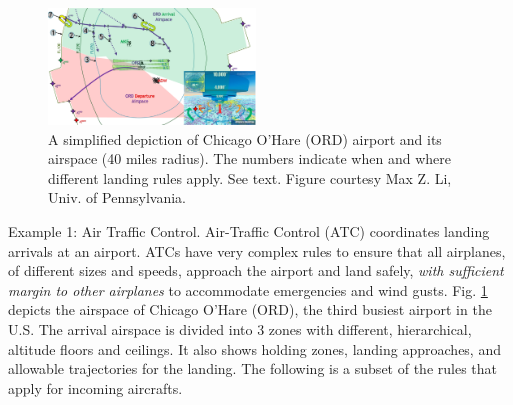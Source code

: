 \begin{figure}[t]
\centering
\includegraphics[width=0.49\textwidth]{figures/ATC_Example}
\caption{{\small A simplified depiction of Chicago O'Hare (ORD) airport and its airspace (40 miles radius). 
		The numbers indicate when and where different landing rules apply. See text. Figure courtesy Max Z. Li, Univ. of Pennsylvania.} }
\label{fig:atc_example}
\end{figure}

{\sf Example 1: Air Traffic Control}.
Air-Traffic Control (ATC) coordinates landing arrivals at an airport. 
ATCs have very complex rules to ensure that all airplanes, of different sizes and speeds, approach the airport and land safely, \textit{with sufficient margin to other airplanes} to accommodate emergencies and wind gusts.
Fig. \ref{fig:atc_example} depicts the airspace of Chicago O'Hare (ORD), the third busiest airport in the U.S.
The arrival airspace is divided into 3 zones with different, hierarchical, altitude floors and ceilings. 
It also shows holding zones, landing approaches, and allowable trajectories for the landing. 
The following is a subset of the rules that apply for incoming aircrafts.

